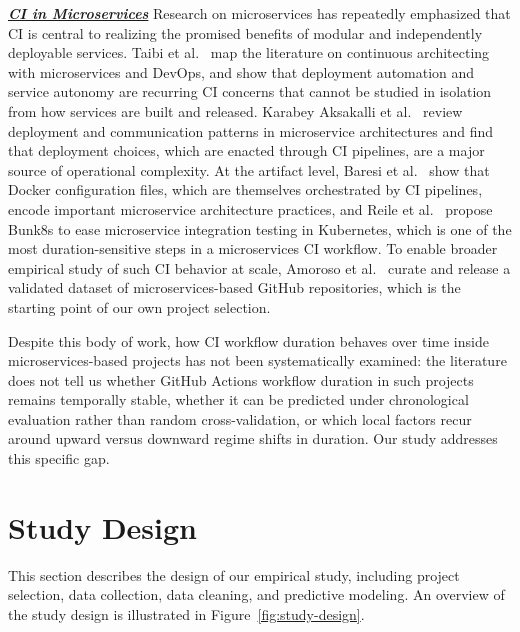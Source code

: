 \documentclass[conference]{IEEEconf}
\newcommand{\ali}[1]{\textcolor{red}{{\it [Ali: #1]}}}
\newcommand{\jasem}[1]{\textcolor{blue}{{\it [Jasem: #1]}}}
\begin{document}
\textbf{\textit{\underline{{CI in Microservices}}}}
Research on microservices has repeatedly emphasized that CI is central to realizing the promised benefits of modular and independently deployable services. Taibi et al.\ \cite{taibi2019continuous} map the literature on continuous architecting with microservices and DevOps, and show that deployment automation and service autonomy are recurring CI concerns that cannot be studied in isolation from how services are built and released. Karabey Aksakalli et al.\ \cite{karabey2021deployment} review deployment and communication patterns in microservice architectures and find that deployment choices, which are enacted through CI pipelines, are a major source of operational complexity. At the artifact level, Baresi et al.\ \cite{baresi2022docker} show that Docker configuration files, which are themselves orchestrated by CI pipelines, encode important microservice architecture practices, and Reile et al.\ \cite{reile2022bunk8s} propose Bunk8s to ease microservice integration testing in Kubernetes, which is one of the most duration-sensitive steps in a microservices CI workflow. To enable broader empirical study of such CI behavior at scale, Amoroso et al.\ \cite{amoroso2024dataset} curate and release a validated dataset of microservices-based GitHub repositories, which is the starting point of our own project selection.

Despite this body of work, how CI workflow duration behaves over time inside microservices-based projects has not been systematically examined: the literature does not tell us whether GitHub Actions workflow duration in such projects remains temporally stable, whether it can be predicted under chronological evaluation rather than random cross-validation, or which local factors recur around upward versus downward regime shifts in duration. Our study addresses this specific gap.


\section{Study Design}

This section describes the design of our empirical study, including project selection, data collection, data cleaning, and predictive modeling. An overview of the study design is illustrated in Figure~\ref{fig:study-design}.
\end{document}
